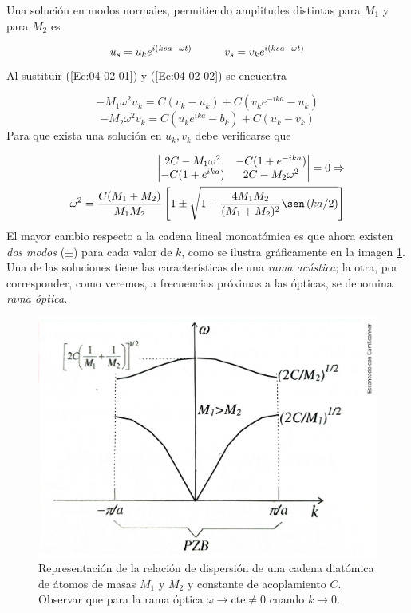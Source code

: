 Una solución en modos normales, permitiendo amplitudes distintas para $M_1$ y para $M_2$ es 

\begin{equation}
	u_s = u_k e^{i(ksa-\omega  t)} \quad \quad \quad v_s = v_k e^{i(ksa-\omega t)} \label{Ec:04-02-02}
\end{equation}
Al sustituir (\ref{Ec:04-02-01}) y (\ref{Ec:04-02-02}) se encuentra 

\begin{equation}
    -M_1 \omega^2 u_k = C(v_k - u_k) + C(v_k e^{-ika}-u_k)
\end{equation}
\begin{equation*}
    -M_2 \omega^2 v_k = C(u_k e^{ika} - b_k) + C(u_k - v_k)    
\end{equation*}
Para que exista una solución en $u_k,v_k$ debe verificarse que

\begin{eqnarray}
    \begin{vmatrix}
        2C - M_1\omega^2 & -C(1+e^{-ika})\\
        -C (1+e^{ika}) & 2C - M_2 \omega^2  
    \end{vmatrix}= 0 \Rightarrow \\
    \omega^2 = \frac{C(M_1+M_2)}{M_1M_2} \ccorchetes{1 \pm \sqrt{1-\frac{4M_1M_2}{(M_1+M_2)^2} \sen \parentesis{  ka/2}}}
\end{eqnarray}
El mayor cambio respecto a la cadena lineal monoatómica es que ahora existen \textit{dos modos} ($\pm$) para cada valor de $k$, como se ilustra gráficamente en la imagen \ref{Fig:04-05}. Una de las soluciones tiene las características de una \textit{rama acústica}; la otra, por corresponder, como veremos, a frecuencias próximas a las ópticas, se denomina \textit{rama óptica.}


\begin{figure}[h!] \centering
    \includegraphics[scale=0.43]{Cuerpo/Ch_04/Fotos libro 5.pdf}
    \caption{Representación de la relación de dispersión de una cadena diatómica de átomos de masas $M_1$ y $M_2$ y constante de acoplamiento $C$. Observar que para la rama óptica $\omega \rightarrow \text{cte} \neq 0$ cuando $k\rightarrow 0$.}
    \label{Fig:04-05}
\end{figure}    

